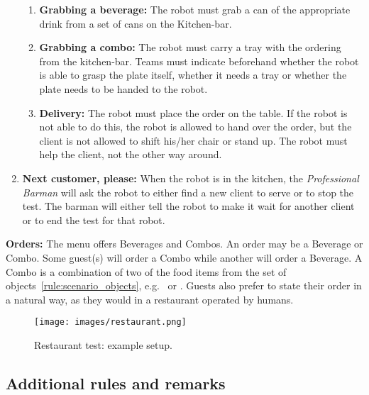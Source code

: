 \begin{enumerate}
\begin{enumerate}
		\item \textbf{Grabbing a beverage:} The robot must grab a can of the appropriate drink from a set of cans on the Kitchen-bar.

		\item \textbf{Grabbing a combo:}  The robot must carry a tray with the ordering from the kitchen-bar.
		Teams must indicate beforehand whether the robot is able to grasp the plate itself, whether it needs a tray or whether the plate needs to be handed to the robot.

		\item \textbf{Delivery:} The robot must place the order on the table.
		If the robot is not able to do this, the robot is allowed to hand over the order, but the client is not allowed to shift his/her chair or stand up.
		The robot must help the client, not the other way around.
	\end{enumerate}

	\item \textbf{Next customer, please:} When the robot is in the kitchen, the \textit{Professional Barman} will ask the robot to either find a new client to serve or to stop the test.
	The barman will either tell the robot  to make it wait for another client or  to end the test for that robot.
\end{enumerate}

\textbf{Orders:} The menu offers Beverages and Combos. An order may be a Beverage or Combo. Some guest(s) will order a Combo while another will order a Beverage.
  A Combo is a combination of two of the food items from the set of objects~\ref{rule:scenario_objects}, e.g.~ or .
  Guests also prefer to state their order in a natural way, as they would in a restaurant operated by humans.

\begin{figure}[tbp]
	\centering
	\texttt{[image: images/restaurant.png]}
	\caption{Restaurant test: example setup.}
	\label{fig:restaurant}
\end{figure}

\subsection{Additional rules and remarks}

